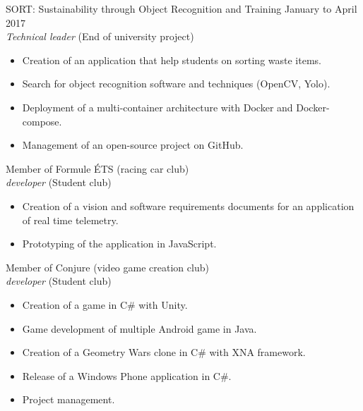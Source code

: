 \documentclass{res}
\newcommand{\inEnglish}[1]{#1}
\begin{document}
\begin{resume}
\inEnglish{
	SORT: Sustainability through Object Recognition and Training
	\hfill January to April 2017 \\
	{\sl Technical leader} \hfill (End of university project)
	\vspace{0.05in}
	\begin{itemize} \itemsep -2pt
		\item Creation of an application that help students on sorting waste items.
		\item Search for object recognition software and techniques (OpenCV, Yolo).
		\item Deployment of a multi-container architecture with Docker and Docker-compose.
		\item Management of an open-source project on GitHub.
	\end{itemize}

	Member of Formule ÉTS (racing car club) \\
	{\sl developer} \hfill (Student club)
	\vspace{0.05in}
	\begin{itemize} \itemsep -2pt
		\item Creation of a vision and software requirements documents for an application of real time telemetry.
		\item Prototyping of the application in JavaScript.
	\end{itemize}

	Member of Conjure (video game creation club) \\
	{\sl developer} \hfill (Student club)
	\vspace{0.05in}
	\begin{itemize} \itemsep -2pt
		\item Creation of a game in C\# with Unity.
		\item Game development of multiple Android game in Java.
		\item Creation of a Geometry Wars clone in C\# with XNA framework.
		\item Release of a Windows Phone application in C\#.
		\item Project management.
	\end{itemize}


}
\end{resume}
\end{document}
